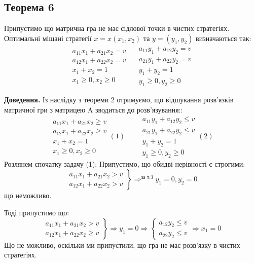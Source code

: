 \documentclass[12pt,a4paper]{book}
\begin{document}
\subsection{Теорема 6}

Припустимо що матрична гра не має сідлової точки в чистих стратегіях. Оптимальні мішані стратегії $x=x(x_1,x_2)$ та $y=(y_1,y_2)$ визначаються так:				
\[\begin{array}{l}
a_{11}x_1+a_{21}x_2=v \\
a_{12}x_1+a_{22}x_2=v \\
x_1+x_2=1	 \\
x_1 \ge 0, x_2 \ge0
\end{array} \quad
\begin{array}{l}
a_{11}y_1+a_{12}y_2=v \\
a_{21}y_1+a_{22}y_2=v \\
y_1+y_2=1	 \\
y_1\ge0,  y_2\ge0
\end{array}\]

{\bf Доведення.}
Із наслідку з теореми 2 отримуємо, що відшукання розв'язків матричної гри з матрицею A зводиться до розв'язування::
\[\begin{array}{l}
a_{11}x_1+a_{21}x_2\ge v \\
a_{12}x_1+a_{22}x_2\ge v \\
x_1+x_2=1	 \\
x_1 \ge 0, x_2 \ge0
\end{array} (1) \qquad 
\begin{array}{l}
a_{11}y_1+a_{12}y_2\le v \\
a_{21}y_1+a_{22}y_2\le v \\
y_1+y_2=1	 \\
y_1\ge0,  y_2\ge0
\end{array} (2)\]
Розлянем спочатку задачу (1):
Припустимо, що обидві нерівності є строгими: 
\[\left.\begin{array}{l}
a_{11}x_1+a_{21}x_2> v \\
a_{12}x_1+a_{22}x_2> v 
\end{array} \right \} \mathop{\Longrightarrow}^{\mbox{за т.3}} y_1=0, y_2=0 \]
що неможливо.

Тоді припустимо що:
\[\left.\begin{array}{l}
a_{11}x_1+a_{21}x_2> v \\
a_{12}x_1+a_{22}x_2 \ge v
\end{array} \right \} \Rightarrow y_1=0 \Rightarrow \left \{
\begin{array}{l}
a_{12}y_2\le v \\
a_{22}y_2\le v
\end{array} \right. \Rightarrow x_1=0\]
Що не можливо, оскільки ми припустили, що гра не має розв'язку в чистих стратегіях.
\end{document}
